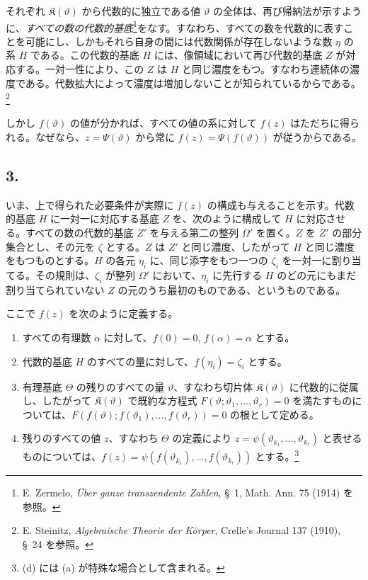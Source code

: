 それぞれ $\mathfrak K(\vartheta)$ から代数的に独立である値 $\vartheta$ の全体は、再び帰納法が示すように、\emph{すべての数の代数的基底}\footnote{E. Zermelo, \emph{Über ganze transzendente Zahlen}, \S\ 1, Math. Ann. 75 (1914) を参照。}をなす。すなわち、すべての数を代数的に表すことを可能にし、しかもそれら自身の間には代数関係が存在しないような数 $\eta$ の系 $H$ である。この代数的基底 $H$ には、像領域において再び代数的基底 $Z$ が対応する。一対一性により、この $Z$ は $H$ と同じ濃度をもつ。すなわち連続体の濃度である。代数拡大によって濃度は増加しないことが知られているからである。\footnote{E. Steinitz, \emph{Algebraische Theorie der Körper}, Crelle's Journal 137 (1910), \S\ 24 を参照。}

しかし $f(\vartheta)$ の値が分かれば、すべての値の系に対して $f(z)$ はただちに得られる。なぜなら、$z=\Psi(\vartheta)$ から常に $f(z)=\Psi(f(\vartheta))$ が従うからである。

\subsection*{3.}

いま、上で得られた必要条件が実際に $f(z)$ の構成も与えることを示す。代数的基底 $H$ に一対一に対応する基底 $Z$ を、次のように構成して $H$ に対応させる。すべての数の代数的基底 $Z'$ を与える第二の整列 $\Omega'$ を置く。$Z$ を $Z'$ の部分集合とし、その元を $\zeta$ とする。$Z$ は $Z'$ と同じ濃度、したがって $H$ と同じ濃度をもつものとする。$H$ の各元 $\eta_i$ に、同じ添字をもつ一つの $\zeta_i$ を一対一に割り当てる。その規則は、$\zeta_i$ が整列 $\Omega'$ において、$\eta_i$ に先行する $H$ のどの元にもまだ割り当てられていない $Z$ の元のうち最初のものである、というものである。

ここで $f(z)$ を次のように定義する。
\begin{enumerate}
\item[a)] すべての有理数 $\alpha$ に対して、$f(0)=0$, $f(\alpha)=\alpha$ とする。
\item[b)] 代数的基底 $H$ のすべての量に対して、$f(\eta_i)=\zeta_i$ とする。
\item[c)] 有理基底 $\Theta$ の残りのすべての量 $\vartheta$、すなわち切片体 $\mathfrak K(\vartheta)$ に代数的に従属し、したがって $\mathfrak K(\vartheta)$ で既約な方程式 $F(\vartheta;\vartheta_1,\ldots,\vartheta_r)=0$ を満たすものについては、$F(f(\vartheta);f(\vartheta_1),\ldots,f(\vartheta_r))=0$ の根として定める。
\item[d)] 残りのすべての値 $z$、すなわち $\Theta$ の定義により $z=\psi(\vartheta_{k_1},\ldots,\vartheta_{k_r})$ と表せるものについては、$f(z)=\psi(f(\vartheta_{k_1}),\ldots,f(\vartheta_{k_r}))$ とする。\footnote{(d) には (a) が特殊な場合として含まれる。}
\end{enumerate}

